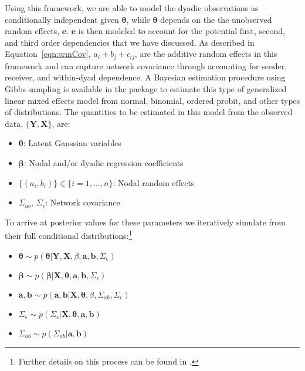 Using this framework, we are able to model the dyadic observations as conditionally independent given $\bm\theta$, while $\bm\theta$ depends on the the unobserved random effects, $\mathbf{e}$. $\mathbf{e}$ is then modeled to account for the potential first, second, and third order dependencies that we have discussed. As described in Equation~\ref{eqn:srmCov}, $a_{i} + b_{j}  + \epsilon_{ij}$, are the additive random effects in this framework and can capture network covariance through accounting for sender, receiver, and within-dyad dependence. A Bayesian estimation procedure using Gibbs sampling is available in the  package to estimate this type of generalized linear mixed effects model from normal, binomial, ordered probit, and other types of distributions. The quantities to be estimated in this model from the observed data, $\{\mathbf{Y}, \mathbf{X}\}$, are:

\begin{itemize}
	\item $\bm\theta$: Latent Gaussian variables
	\item $\bm\beta$: Nodal and/or dyadic regression coefficients
	\item $\{(a_{i},b_{i})\} \in \{i=1, \ldots, n \}$: Nodal random effects
	\item $\Sigma_{ab},\, \Sigma_{\epsilon}$: Network covariance
\end{itemize}

To arrive at posterior values for these parameters we iteratively simulate from their full conditional distributions:\footnote{Further details on this process can be found in \citet{hoff:2005}.}

\begin{itemize}
	\item $\bm\theta \sim p(\bm\theta | \mathbf{Y}, \mathbf{X}, \beta, \mathbf{a}, \mathbf{b}, \Sigma_{\epsilon})$	
	\item $\bm\beta \sim p(\bm\beta | \mathbf{X}, \bm\theta, \mathbf{a}, \mathbf{b}, \Sigma_{\epsilon})$
	\item $\mathbf{a}, \mathbf{b} \sim p(\mathbf{a}, \mathbf{b} | \mathbf{X}, \bm\theta, \beta, \Sigma_{ab}, \Sigma_{\epsilon})$
	\item $\Sigma_{\epsilon} \sim p(\Sigma_{\epsilon} | \mathbf{X}, \bm\theta, \mathbf{a}, \mathbf{b})$
	\item $\Sigma_{ab} \sim p(\Sigma_{ab} | \mathbf{a}, \mathbf{b})$
\end{itemize}

